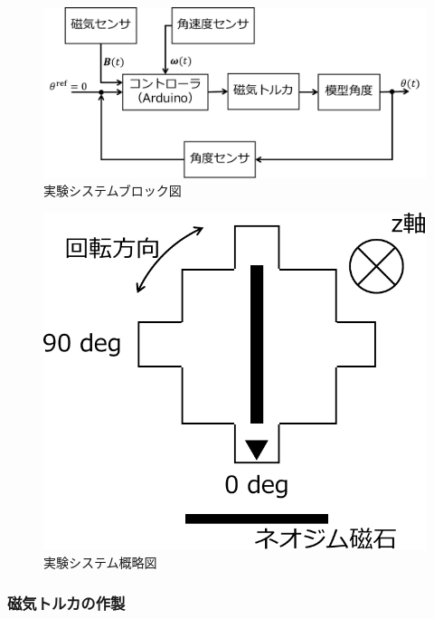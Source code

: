 \begin{figure}[H]
	\centering
		\includegraphics[scale=0.5]{./figure/block-crop.pdf}
		\caption{実験システムブロック図}
		\label{fig:systemblock}
\end{figure}

\begin{figure}[H]
	\centering
		\includegraphics[scale=0.5]{./figure/system-crop.pdf}
		\caption{実験システム概略図}
		\label{fig:systemfig}
\end{figure}



\subsubsection{磁気トルカの作製}

